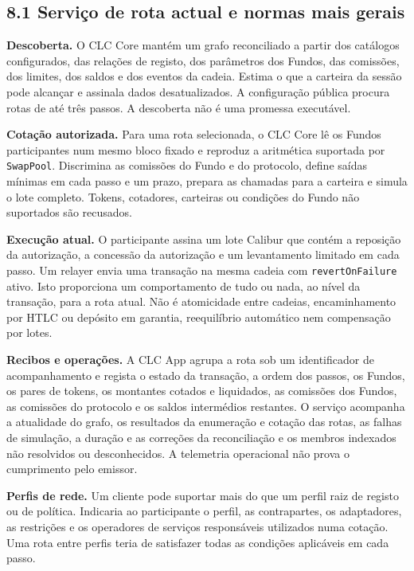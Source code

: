 \documentclass[11pt]{article}
\begin{document}
\subsection*{8.1 Serviço de rota actual e normas mais gerais}

\textbf{Descoberta.} O CLC Core mantém um grafo reconciliado a partir dos catálogos configurados, das relações de registo, dos parâmetros dos Fundos, das comissões, dos limites, dos saldos e dos eventos da cadeia. Estima o que a carteira da sessão pode alcançar e assinala dados desatualizados. A configuração pública procura rotas de até três passos. A descoberta não é uma promessa executável.

\textbf{Cotação autorizada.} Para uma rota selecionada, o CLC Core lê os Fundos participantes num mesmo bloco fixado e reproduz a aritmética suportada por \texttt{SwapPool}. Discrimina as comissões do Fundo e do protocolo, define saídas mínimas em cada passo e um prazo, prepara as chamadas para a carteira e simula o lote completo. Tokens, cotadores, carteiras ou condições do Fundo não suportados são recusados.

\textbf{Execução atual.} O participante assina um lote Calibur que contém a reposição da autorização, a concessão da autorização e um levantamento limitado em cada passo. Um relayer envia uma transação na mesma cadeia com \texttt{revertOnFailure} ativo. Isto proporciona um comportamento de tudo ou nada, ao nível da transação, para a rota atual. Não é atomicidade entre cadeias, encaminhamento por HTLC ou depósito em garantia, reequilíbrio automático nem compensação por lotes.

\textbf{Recibos e operações.} A CLC App agrupa a rota sob um identificador de acompanhamento e regista o estado da transação, a ordem dos passos, os Fundos, os pares de tokens, os montantes cotados e liquidados, as comissões dos Fundos, as comissões do protocolo e os saldos intermédios restantes. O serviço acompanha a atualidade do grafo, os resultados da enumeração e cotação das rotas, as falhas de simulação, a duração e as correções da reconciliação e os membros indexados não resolvidos ou desconhecidos. A telemetria operacional não prova o cumprimento pelo emissor.

\textbf{Perfis de rede.} Um cliente pode suportar mais do que um perfil raiz de registo ou de política. Indicaria ao participante o perfil, as contrapartes, os adaptadores, as restrições e os operadores de serviços responsáveis utilizados numa cotação. Uma rota entre perfis teria de satisfazer todas as condições aplicáveis em cada passo.
\end{document}
